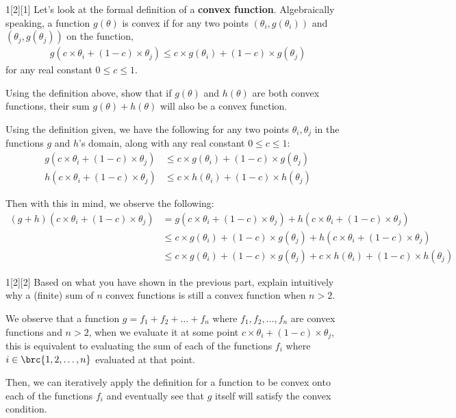 \documentclass{article}
\begin{document}
\begin{dshw}{1}[2][1]
	Let's look at the formal definition of a \textbf{convex function}.  Algebraically speaking, a function $g(\theta)$ is convex if for any two points $(\theta_i, g(\theta_i))$ and $(\theta_j, g(\theta_j))$ on the function,
	\begin{align*}
		g(c\times\theta_i + (1-c)\times\theta_j) \le c\times g(\theta_i) + (1-c)\times g(\theta_j)
	\end{align*}
	for any real constant $0 \le c \le 1$.
	
	Using the definition above, show that if $g(\theta)$ and $h(\theta)$ are both convex functions, their sum $g(\theta) + h(\theta)$ will also be a convex function.
\end{dshw}
\begin{solution}
	Using the definition given, we have the following for any two points $\theta_i, \theta_j$ in the functions $g$ and $h$'s domain, along with any real constant $0 \leq c \leq 1$:
	\begin{align*}
		g(c\times\theta_i + (1-c)\times\theta_j) &\leq c\times g(\theta_i) + (1-c)\times g(\theta_j) \\
		h(c\times\theta_i + (1-c)\times\theta_j) &\leq c\times h(\theta_i) + (1-c)\times h(\theta_j)
	\end{align*}

	Then with this in mind, we observe the following:
	\begin{align*}
		(g + h)(c\times\theta_i + (1-c)\times\theta_j) &= g(c\times\theta_i + (1-c)\times\theta_j) + h(c\times\theta_i + (1-c)\times\theta_j) \\
		&\leq c\times g(\theta_i) + (1-c)\times g(\theta_j) + h(c\times\theta_i + (1-c)\times\theta_j) \\
		&\leq c\times g(\theta_i) + (1-c)\times g(\theta_j) + c\times h(\theta_i) + (1-c)\times h(\theta_j)
	\end{align*}
\end{solution}

\begin{dshw}{1}[2][2]
	Based on what you have shown in the previous part, explain intuitively why a (finite) sum of $n$ convex functions is still a convex function when $n > 2$.
\end{dshw}
\begin{solution}
	We observe that a function $g = f_{1} + f_{2} + \ldots + f_{n}$ where $f_{1}, f_{2}, \ldots, f_{n}$ are convex functions and $n > 2$, when we evaluate it at some point $c\times\theta_i + (1-c)\times\theta_j$, this is equivalent to evaluating the sum of each of the functions $f_{i}$ where $i \in \brc{1, 2, \ldots, n}$ evaluated at that point.
	
	Then, we can iteratively apply the definition for a function to be convex onto each of the functions $f_{i}$ and eventually see that $g$ itself will satisfy the convex condition.
\end{solution}
\end{document}
